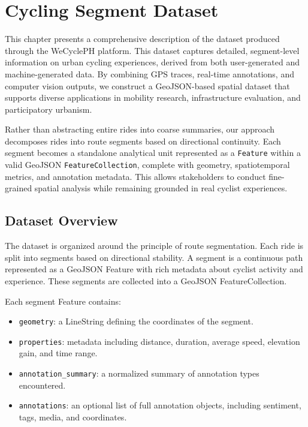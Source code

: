 %
%
%                 

\chapter{Cycling Segment Dataset}

This chapter presents a comprehensive description of the dataset produced through the WeCyclePH platform. This dataset captures detailed, segment-level information on urban cycling experiences, derived from both user-generated and machine-generated data. By combining GPS traces, real-time annotations, and computer vision outputs, we construct a GeoJSON-based spatial dataset that supports diverse applications in mobility research, infrastructure evaluation, and participatory urbanism.

Rather than abstracting entire rides into coarse summaries, our approach decomposes rides into route segments based on directional continuity. Each segment becomes a standalone analytical unit represented as a \texttt{Feature} within a valid GeoJSON \texttt{FeatureCollection}, complete with geometry, spatiotemporal metrics, and annotation metadata. This allows stakeholders to conduct fine-grained spatial analysis while remaining grounded in real cyclist experiences.

\section{Dataset Overview}
The dataset is organized around the principle of route segmentation. Each ride is split into segments based on directional stability. A segment is a continuous path represented as a GeoJSON Feature with rich metadata about cyclist activity and experience. These segments are collected into a GeoJSON FeatureCollection.

Each segment Feature contains:
\begin{itemize}
\item \texttt{geometry}: a LineString defining the coordinates of the segment.
\item \texttt{properties}: metadata including distance, duration, average speed, elevation gain, and time range.
\item \texttt{annotation\_summary}: a normalized summary of annotation types encountered.
\item \texttt{annotations}: an optional list of full annotation objects, including sentiment, tags, media, and coordinates.
\end{itemize}

